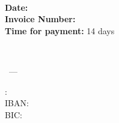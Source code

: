 \documentclass[onecolumn]{article} %
\begin{document}
\vspace{2cm}


\begin{multicols}{3}
\begin{flushleft}
\clientfullname\\
\clientcontact\\
\clientstreet\\
\clientzipcode~\clientcity\\
\clientcountry\\
\end{flushleft}


\columnbreak
\begin{flushleft}
\vfill
\end{flushleft}
\vspace{2cm}

\columnbreak
\begin{flushleft}
\vspace*{1cm}
\myfullname\\
\mystreet\\
\myzipcode~\mycity\\
\myphone\\
\href{\mywebsite}{\mywebsite}\\
\href{\myemail}{\myemail}\\
\end{flushleft}

\end{multicols}

\begin{flushright}
\textbf{Date:} \invoicedate\\
\textbf{Invoice Number:} \invoicenumber\\
\textbf{Time for payment:} 14 days\\
\end{flushright}

\begin{flushleft}
\begin{LARGE}
\trinvoice \invoicenumber\\
\end{LARGE}

\trperformanceperiod \invoiceperiodbegin~---~\invoiceperiodend

\vspace{1.0cm}

\trsalutationtext

\begin{positiontable}
\end{positiontable}



\trpaymentrequesttext

\begin{tabbing}
\traccountholder: \= \textbf{\myfullname}\\
IBAN: \> \textbf{\myiban}\\
BIC: \> \textbf{\mybic}\\
\end{tabbing}
\vspace{0.25cm}

\trclosing
\break
\break
\myfullname

\end{flushleft}
\end{document}
